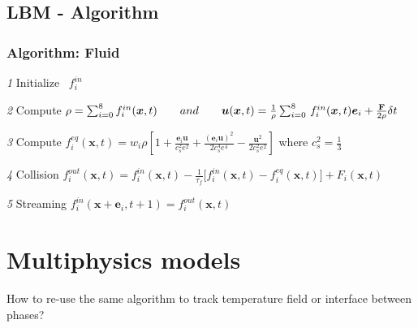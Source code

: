 \documentclass[10pt,handout]{beamer}
\begin{document}
\subsection{LBM - Algorithm}
\begin{frame}[plain] \frametitle{Algorithm: Fluid} 
\textit{1} Initialize $ \enspace f_i ^{in} $ \\ \vspace{2.5em}

\pause 
\textit{2} Compute 
$ \rho = \sum_{i=0}^{8} f_i ^{in}(\boldsymbol{x},t)
          \hspace{2 em}  and  \hspace{2 em}
      	 \boldsymbol{u}(\boldsymbol{x},t) = \frac{1}{\rho} \sum_{i=0}^{8} \, f_i ^{in}(\boldsymbol{x},t) \boldsymbol{e}_i +  \frac{\textbf{F}}{2 \rho} \delta t 
      	 $ \\ \vspace{2.5em}

\pause
\textit{3} Compute 
$  f_i ^{eq}(\boldsymbol{x},t) =  w_i \rho 
 \left[ 1 + \frac{\boldsymbol{e}_i \boldsymbol{u}}{c_s^2 e^2} + \frac{ (\boldsymbol{e}_i \boldsymbol{u})^2}{2 c_s^4 e^4} - \frac{\boldsymbol{u}^2 } {2c_s^2 e^2} \right] $  where $c_s^2 = \frac{1}{3}$
 \\ \vspace{2.5em}

\pause 
\textit{4} Collision  
$  f_i ^{out}(\boldsymbol{x},t) = f_i^{in}(\boldsymbol{x},t) - \frac{1}{\tau_f} \bigg[ f_i^{in}(\boldsymbol{x},t) - f_i^{eq}(\boldsymbol{x},t) \bigg] + F_i(\bm{x}, t ) $ \\ \vspace{2.5em}

\pause
\textit{5} Streaming 
$  f_i ^{in}(\boldsymbol{x} + \boldsymbol{e}_i ,t+1) =  f_i^{out} (\boldsymbol{x},t) $ 

\end{frame} 



\section{Multiphysics models}
\begin{frame}[standout]
How to re-use the same algorithm to track temperature field or interface between phases?
\end{frame}
\end{document}
